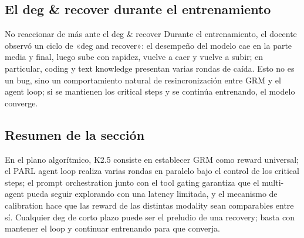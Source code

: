 \subsection{El deg \& recover durante el entrenamiento}
\begin{warningbox}{No reaccionar de más ante el deg \& recover}
Durante el entrenamiento, el docente observó un ciclo de «deg and recover»: el desempeño del modelo cae en la parte media y final, luego sube con rapidez, vuelve a caer y vuelve a subir; en particular, coding y text knowledge presentan varias rondas de caída. Esto no es un bug, sino un comportamiento natural de resincronización entre GRM y el agent loop; si se mantienen los critical steps y se continúa entrenando, el modelo converge.
\end{warningbox}

\subsection{Resumen de la sección}
En el plano algorítmico, K2.5 consiste en establecer GRM como reward universal; el PARL agent loop realiza varias rondas en paralelo bajo el control de los critical steps; el prompt orchestration junto con el tool gating garantiza que el multi-agent pueda seguir explorando con una latency limitada, y el mecanismo de calibration hace que las reward de las distintas modality sean comparables entre sí. Cualquier deg de corto plazo puede ser el preludio de una recovery; basta con mantener el loop y continuar entrenando para que converja.
